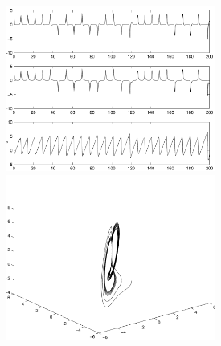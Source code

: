 \documentclass{ximera}
\begin{document}
\begin{computerExercise}
\begin{solution}
\begin{figure}[htb]
     \centerline{%
     \includegraphics[width=2.7in]{exfigure/figf14_6_9.pdf}
     \includegraphics[width=2.7in]{exfigure/figf14_6_9a.pdf}}
\end{figure} 

















\end{solution}
\end{computerExercise}
\end{document}
